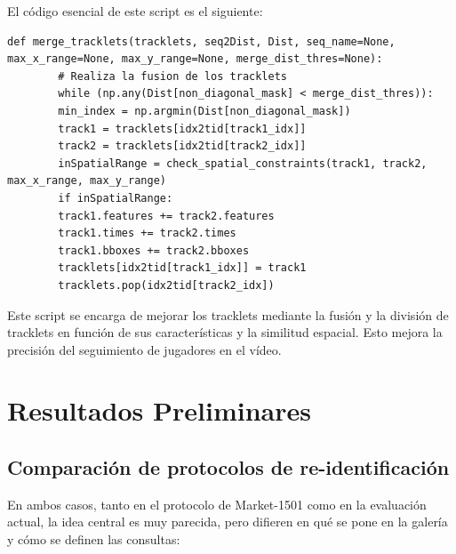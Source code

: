 \documentclass[12pt, a4paper, twoside]{article}
\begin{document}
	El código esencial de este script es el siguiente:
	
	\begin{lstlisting}[style=pythonstyle]
		def merge_tracklets(tracklets, seq2Dist, Dist, seq_name=None, max_x_range=None, max_y_range=None, merge_dist_thres=None):
		# Realiza la fusion de los tracklets
		while (np.any(Dist[non_diagonal_mask] < merge_dist_thres)):
		min_index = np.argmin(Dist[non_diagonal_mask])
		track1 = tracklets[idx2tid[track1_idx]]
		track2 = tracklets[idx2tid[track2_idx]]
		inSpatialRange = check_spatial_constraints(track1, track2, max_x_range, max_y_range)
		if inSpatialRange:
		track1.features += track2.features
		track1.times += track2.times
		track1.bboxes += track2.bboxes
		tracklets[idx2tid[track1_idx]] = track1
		tracklets.pop(idx2tid[track2_idx])
	\end{lstlisting}
	
	Este script se encarga de mejorar los tracklets mediante la fusión y la división de tracklets en función de sus características y la similitud espacial. Esto mejora la precisión del seguimiento de jugadores en el vídeo.
	
	
	
	\section{Resultados Preliminares}
	
 	\subsection{Comparación de protocolos de re-identificación} \cite{7410490}
 	
 	En ambos casos, tanto en el protocolo de Market-1501 como en la evaluación actual, la idea central es muy parecida, pero difieren en qué se pone en la galería y cómo se definen las consultas:
 	
\end{document}
